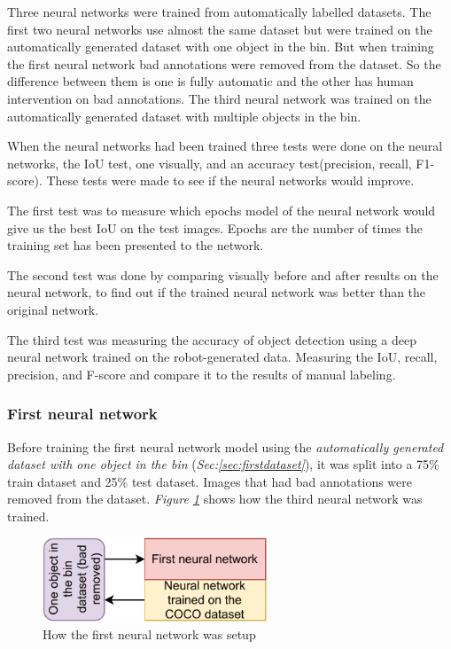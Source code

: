 Three neural networks were trained from automatically labelled datasets. 
The first two neural networks use almost the same dataset but were trained on the automatically generated dataset with one object in the bin. But when training the first neural network bad annotations were removed from the dataset. 
So the difference between them is one is fully automatic and the other has human intervention on bad annotations.
The third neural network was trained on the automatically generated dataset with multiple objects in the bin.

When the neural networks had been trained three tests were done on the neural networks, the IoU test, one visually, and an accuracy test(precision, recall, F1-score). These tests were made to see if the neural networks would improve. 

The first test was to measure which epochs model of the neural network would give us the best IoU on the test images. Epochs are the number of times the training set has been presented to the network.

The second test was done by comparing visually before and after results on the neural network, to find out if the trained neural network was better than the original network.

The third test was measuring the accuracy of object detection using a deep neural network trained on the robot-generated data. Measuring the IoU, recall, precision, and F-score and compare it to the results of manual labeling. 


\subsubsection{First neural network}
Before training the first neural network model using the \textit{automatically generated dataset with one object in the bin}  (\textit{Sec:\ref{sec:firstdataset}}), it was split into a 75\% train dataset and 25\% test dataset. Images that had bad annotations were removed from the dataset. \textit{Figure \ref{fig:firstneural}} shows how the third neural network was trained.

\begin{figure}[h]
    \centering
    \includegraphics[width=0.6\textwidth]{graphics/results/firstneural.pdf}
    \caption{How the first neural network was setup}
    \label{fig:firstneural}
\end{figure}

